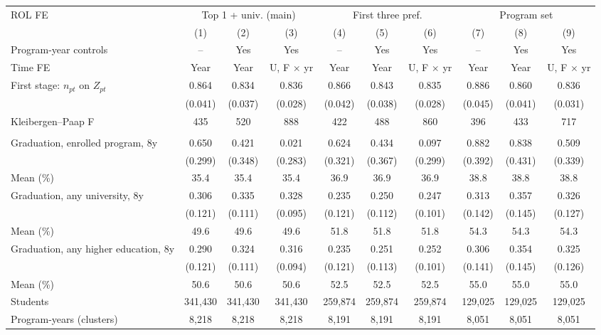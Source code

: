 \begin{tabular}{l*{9}{c}}
\toprule
ROL FE & \multicolumn{3}{c}{Top 1 + univ. (main)} & \multicolumn{3}{c}{First three pref.} & \multicolumn{3}{c}{Program set} \\
\cmidrule(lr){2-4}\cmidrule(lr){5-7}\cmidrule(lr){8-10}
 & (1) & (2) & (3) & (4) & (5) & (6) & (7) & (8) & (9) \\
Program-year controls & -- & Yes & Yes & -- & Yes & Yes & -- & Yes & Yes \\
Time FE & Year & Year & U, F \(\times\) yr & Year & Year & U, F \(\times\) yr & Year & Year & U, F \(\times\) yr \\
\midrule
First stage: \(n_{pt}\) on \(Z_{pt}\) & 0.864\sym{***} & 0.834\sym{***} & 0.836\sym{***} & 0.866\sym{***} & 0.843\sym{***} & 0.835\sym{***} & 0.886\sym{***} & 0.860\sym{***} & 0.836\sym{***} \\
 & (0.041) & (0.037) & (0.028) & (0.042) & (0.038) & (0.028) & (0.045) & (0.041) & (0.031) \\
Kleibergen--Paap F &   435 &   520 &   888 &   422 &   488 &   860 &   396 &   433 &   717 \\
\addlinespace
\multicolumn{10}{l}{2SLS (pp per ten entrants)} \\
\quad Graduation, enrolled program, 8y &  0.650\sym{**} &  0.421 &  0.021 &  0.624\sym{*} &  0.434 &  0.097 &  0.882\sym{**} &  0.838\sym{*} &  0.509 \\
 & (0.299) & (0.348) & (0.283) & (0.321) & (0.367) & (0.299) & (0.392) & (0.431) & (0.339) \\
\quad \quad Mean (\%) & 35.4 & 35.4 & 35.4 & 36.9 & 36.9 & 36.9 & 38.8 & 38.8 & 38.8 \\
\quad Graduation, any university, 8y &  0.306\sym{**} &  0.335\sym{***} &  0.328\sym{***} &  0.235\sym{*} &  0.250\sym{**} &  0.247\sym{**} &  0.313\sym{**} &  0.357\sym{**} &  0.326\sym{**} \\
 & (0.121) & (0.111) & (0.095) & (0.121) & (0.112) & (0.101) & (0.142) & (0.145) & (0.127) \\
\quad \quad Mean (\%) & 49.6 & 49.6 & 49.6 & 51.8 & 51.8 & 51.8 & 54.3 & 54.3 & 54.3 \\
\quad Graduation, any higher education, 8y &  0.290\sym{**} &  0.324\sym{***} &  0.316\sym{***} &  0.235\sym{*} &  0.251\sym{**} &  0.252\sym{**} &  0.306\sym{**} &  0.354\sym{**} &  0.325\sym{***} \\
 & (0.121) & (0.111) & (0.094) & (0.121) & (0.113) & (0.101) & (0.141) & (0.145) & (0.126) \\
\quad \quad Mean (\%) & 50.6 & 50.6 & 50.6 & 52.5 & 52.5 & 52.5 & 55.0 & 55.0 & 55.0 \\
\midrule
Students &   341,430 &   341,430 &   341,430 &   259,874 &   259,874 &   259,874 &   129,025 &   129,025 &   129,025 \\
Program-years (clusters) &  8,218 &  8,218 &  8,218 &  8,191 &  8,191 &  8,191 &  8,051 &  8,051 &  8,051 \\
\bottomrule
\end{tabular}
